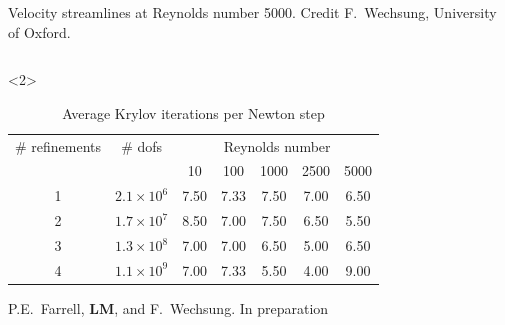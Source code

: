 \documentclass[presentation]{beamer}
\begin{document}
\begin{frame}
\begin{onlyenv}
\begin{columns}
\begin{column}{0.48\textwidth}
\begin{center}
          {\tiny Velocity streamlines at Reynolds number 5000.
            Credit F.~Wechsung, University of Oxford.}
        \end{center}
      \end{column}
    \end{columns}
  \end{onlyenv}
  \begin{onlyenv}<2>
    \begin{table}
      \centering
      \begin{tabular}{cc|ccccc}
        \toprule
        \# refinements & \# dofs & \multicolumn{5}{c}{Reynolds number} \\
                       && 10 & 100 & 1000 & 2500 & 5000 \\
        \midrule
        1 & $2.1 \times 10^6$ & 7.50 & 7.33 & 7.50 & 7.00 & 6.50 \\
        2 & $1.7 \times 10^7$ & 8.50 & 7.00 & 7.50 & 6.50 & 5.50 \\
        3 & $1.3 \times 10^8$ & 7.00 & 7.00 & 6.50 & 5.00 & 6.50 \\
        4 & $1.1 \times 10^9$ & 7.00 & 7.33 & 5.50 & 4.00 & 9.00 \\
        \bottomrule
      \end{tabular}
      \caption{Average Krylov iterations per Newton step}
    \end{table}
  \end{onlyenv}
  \begin{flushright}
    {\scriptsize P.E.~Farrell, \textbf{LM}, and F.~Wechsung. In preparation}
  \end{flushright}
\end{frame}
\end{document}
